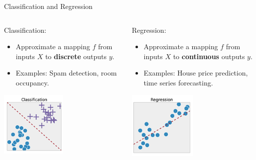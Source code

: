 \begin{frame}{Classification and Regression}
  
  \begin{columns}
    \begin{column}{.5\textwidth}
    
    Classification:
    \begin{itemize}
      \item Approximate a mapping $f$ from inputs $X$ to \textbf{discrete} outputs $y$.
      \item Examples: Spam detection, room occupancy.
    \end{itemize}
      \begin{center}
        \includegraphics[width=0.5\textwidth]{images/classification.png}
      \end{center}
    \end{column}  
    \begin{column}{.5\textwidth}
    Regression:
    \begin{itemize}
      \item Approximate a mapping $f$ from inputs $X$ to \textbf{continuous} outputs $y$.
      \item Examples: House price prediction, time series forecasting.
    \end{itemize}
    \begin{center}
      \includegraphics[width=0.5\textwidth]{images/regression.png}
    \end{center}
    \end{column}
  \end{columns}
\end{frame}


